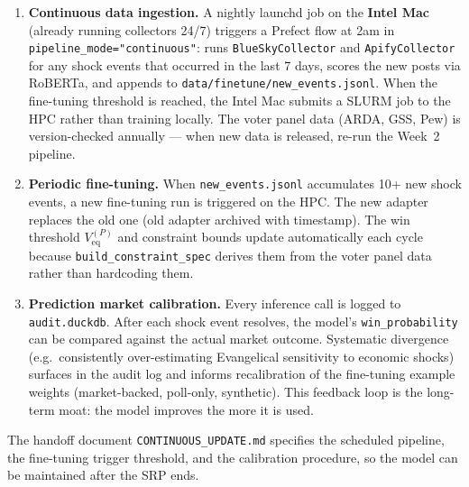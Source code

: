 \documentclass[11pt]{article}
\newcommand{\veq}{V_{\mathrm{eq}}}
\begin{document}
\begin{enumerate}[leftmargin=2em, itemsep=6pt]
        \begin{enumerate}[leftmargin=2em, itemsep=3pt]
          \item \textbf{Continuous data ingestion.} A nightly launchd job on the
                \textbf{Intel Mac} (already running collectors 24/7) triggers a
                Prefect flow at 2am in \texttt{pipeline\_mode="continuous"}: runs
                \texttt{BlueSkyCollector} and \texttt{ApifyCollector} for any shock
                events that occurred in the last 7 days, scores the new posts via
                RoBERTa, and appends to \texttt{data/finetune/new\_events.jsonl}.
                When the fine-tuning threshold is reached, the Intel Mac submits
                a SLURM job to the HPC rather than training locally.
                The voter panel data (ARDA, GSS, Pew) is version-checked annually
                --- when new data is released, re-run the Week~2 pipeline.

          \item \textbf{Periodic fine-tuning.} When \texttt{new\_events.jsonl}
                accumulates 10+ new shock events, a new fine-tuning run is triggered
                on the HPC. The new adapter replaces the old one (old adapter archived
                with timestamp). The win threshold $\veq^{(P)}$ and constraint bounds
                update automatically each cycle because \texttt{build\_constraint\_spec}
                derives them from the voter panel data rather than hardcoding them.

          \item \textbf{Prediction market calibration.} Every inference call is
                logged to \texttt{audit.duckdb}. After each shock event resolves,
                the model's \texttt{win\_probability} can be compared against the
                actual market outcome. Systematic divergence (e.g.\ consistently
                over-estimating Evangelical sensitivity to economic shocks) surfaces
                in the audit log and informs recalibration of the fine-tuning
                example weights (market-backed, poll-only, synthetic). This feedback
                loop is the long-term moat: the model improves the more it is used.
        \end{enumerate}

        The handoff document \texttt{CONTINUOUS\_UPDATE.md} specifies the scheduled
        pipeline, the fine-tuning trigger threshold, and the calibration procedure,
        so the model can be maintained after the SRP ends.
\end{enumerate}
\end{document}
